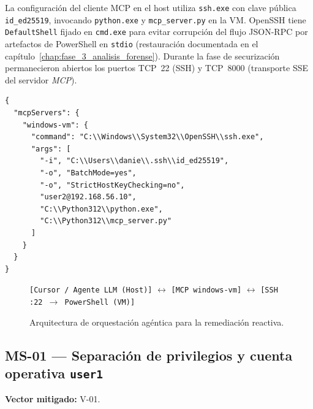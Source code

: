 La configuración del cliente MCP en el host utiliza \texttt{ssh.exe} con clave pública \texttt{id\_ed25519}, invocando \texttt{python.exe} y \texttt{mcp\_}\allowbreak\texttt{server.py} en la VM. OpenSSH tiene \texttt{DefaultShell} fijado en \texttt{cmd.exe} para evitar corrupción del flujo JSON-RPC por artefactos de PowerShell en \texttt{stdio} (restauración documentada en el capítulo~\ref{chap:fase_3_analisis_forense}). Durante la fase de securización permanecieron abiertos los puertos TCP~22 (SSH) y TCP~8000 (transporte SSE del servidor \textit{MCP}).

\begin{lstlisting}[caption={Fragmento de configuración MCP en el host.}]
{
  "mcpServers": {
    "windows-vm": {
      "command": "C:\\Windows\\System32\\OpenSSH\\ssh.exe",
      "args": [
        "-i", "C:\\Users\\danie\\.ssh\\id_ed25519",
        "-o", "BatchMode=yes",
        "-o", "StrictHostKeyChecking=no",
        "user2@192.168.56.10",
        "C:\\Python312\\python.exe",
        "C:\\Python312\\mcp_server.py"
      ]
    }
  }
}
\end{lstlisting}

\begin{figure}[htbp]
    \centering
    \begin{minipage}{0.92\textwidth}
    \centering
    \texttt{[Cursor / Agente LLM (Host)]} $\longleftrightarrow$ \texttt{[MCP windows-vm]} $\longleftrightarrow$ \texttt{[SSH :22 $\rightarrow$}\allowbreak\texttt{ PowerShell (VM)]}
    \end{minipage}
    \caption{Arquitectura de orquestación agéntica para la remediación reactiva.}
    \label{fig:arquitectura_mcp}
\end{figure}

\subsection{MS-01 --- Separación de privilegios y cuenta operativa \texttt{user1}}

\textbf{Vector mitigado:} V-01.

